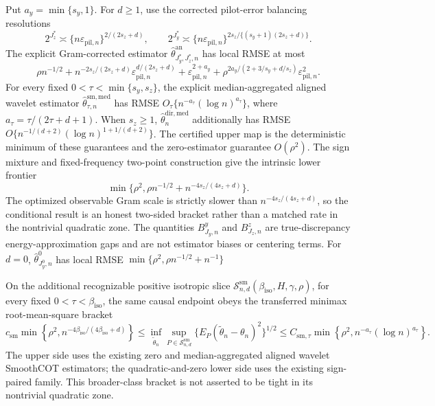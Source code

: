 Put \(a_y=\min\{s_y,1\}\). For \(d\ge1\), use the corrected pilot-error balancing resolutions
\[
2^{J_z^*}\asymp\{n\varepsilon_{\mathrm{pil},n}\}^{2/(2s_z+d)},
\qquad
2^{J_y^*}\asymp\{n\varepsilon_{\mathrm{pil},n}\}^{2s_z/\{(s_y+1)(2s_z+d)\}}.
\]
The explicit Gram-corrected estimator \(\widehat\theta^{\mathrm{an}}_{J_y^*,J_z^*,n}\) has local RMSE at most
\[
\rho n^{-1/2}
+n^{-2s_z/(2s_z+d)}\varepsilon_{\mathrm{pil},n}^{d/(2s_z+d)}
+\varepsilon_{\mathrm{pil},n}^{2+a_y}
+\rho^{2a_y/(2+3/s_y+d/s_z)}\varepsilon_{\mathrm{pil},n}^2.
\]
For every fixed \(0<\tau<\min\{s_y,s_z\}\), the explicit median-aggregated aligned wavelet estimator \(\widehat\theta^{\mathrm{sm,med}}_{\tau,n}\) has RMSE \(O_\tau\{n^{-a_\tau}(\log n)^{a_\tau}\}\), where \(a_\tau=\tau/(2\tau+d+1)\). When \(s_z\ge1\), \(\widehat\theta_n^{\mathrm{dir,med}}\) additionally has RMSE \(O\{n^{-1/(d+2)}(\log n)^{1+1/(d+2)}\}\). The certified upper map is the deterministic minimum of these guarantees and the zero-estimator guarantee \(O(\rho^2)\). The sign mixture and fixed-frequency two-point construction give the intrinsic lower frontier
\[
\min\{\rho^2,\rho n^{-1/2}+n^{-4s_z/(4s_z+d)}\}.
\]
The optimized observable Gram scale is strictly slower than \(n^{-4s_z/(4s_z+d)}\), so the conditional result is an honest two-sided bracket rather than a matched rate in the nontrivial quadratic zone.  The quantities \(B^y_{J_y,n}\) and \(B^z_{J_z,n}\) are true-discrepancy energy-approximation gaps and are not estimator biases or centering terms. For \(d=0\), \(\widehat\theta^0_{J_y^0,n}\) has local RMSE \(\min\{\rho^2,\rho n^{-1/2}+n^{-1}\}\)

On the additional recognizable positive isotropic slice \(\mathcal S^{\mathrm{sm}}_{n,d}(\beta_{\mathrm{iso}},H,\gamma,\rho)\), for every fixed \(0<\tau<\beta_{\mathrm{iso}}\), the same causal endpoint obeys the transferred minimax root-mean-square bracket
\[
c_{\mathrm{sm}}\min\!\left\{\rho^2,n^{-4\beta_{\mathrm{iso}}/(4\beta_{\mathrm{iso}}+d)}\right\}
\le \inf_{\widetilde\theta_n}\sup_{P\in\mathcal S^{\mathrm{sm}}_{n,d}}
\{E_P(\widetilde\theta_n-\theta_n)^2\}^{1/2}
\le C_{\mathrm{sm},\tau}\min\!\left\{\rho^2,n^{-a_\tau}(\log n)^{a_\tau}\right\}.
\]
The upper side uses the existing zero and median-aggregated aligned wavelet SmoothCOT estimators; the quadratic-and-zero lower side uses the existing sign-paired family. This broader-class bracket is not asserted to be tight in its nontrivial quadratic zone.
